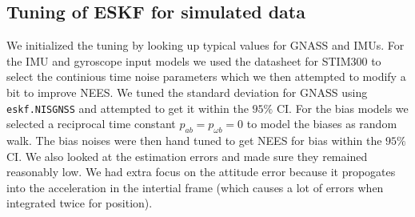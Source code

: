 \subsection{Tuning of ESKF for simulated data}

We initialized the tuning by looking up typical values for GNASS and IMUs. For the IMU and gyroscope input models we used the datasheet for STIM300 to select the continious time noise parameters which we then attempted to modify a bit to improve NEES. We tuned the standard deviation for GNASS using \texttt{eskf.NISGNSS} and attempted to get it within the $95\%$ CI. For the bias models we selected a reciprocal time constant $p_{ab} = p_{\omega b} = 0$ to model the biases as random walk. The bias noises were then hand tuned to get NEES for bias within the $95\%$ CI. We also looked at the estimation errors and made sure they remained reasonably low. We had extra focus on the attitude error because it propogates into the acceleration in the intertial frame (which causes a lot of errors when integrated twice for position).

